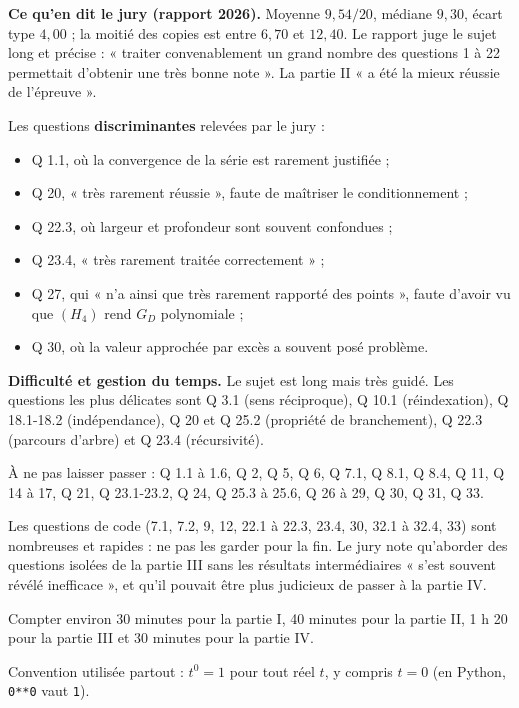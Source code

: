 \documentclass[11pt,a4paper]{article}
\providecommand{\tightlist}{\setlength{\itemsep}{0pt}\setlength{\parskip}{0pt}}
\begin{document}
\textbf{Ce qu'en dit le jury (rapport 2026).} Moyenne \(9{,}54/20\), médiane \(9{,}30\), écart type \(4{,}00\) ; la moitié des copies est entre \(6{,}70\) et \(12{,}40\). Le rapport juge le sujet long et précise : « traiter convenablement un grand nombre des questions 1 à 22 permettait d'obtenir une très bonne note ». La partie II « a été la mieux réussie de l'épreuve ».

Les questions \textbf{discriminantes} relevées par le jury :

\begin{itemize}
\tightlist
\item
  Q 1.1, où la convergence de la série est rarement justifiée ;
\item
  Q 20, « très rarement réussie », faute de maîtriser le conditionnement ;
\item
  Q 22.3, où largeur et profondeur sont souvent confondues ;
\item
  Q 23.4, « très rarement traitée correctement » ;
\item
  Q 27, qui « n'a ainsi que très rarement rapporté des points », faute d'avoir vu que \((H_4)\) rend \(G_D\) polynomiale ;
\item
  Q 30, où la valeur approchée par excès a souvent posé problème.
\end{itemize}

\textbf{Difficulté et gestion du temps.} Le sujet est long mais très guidé. Les questions les plus délicates sont Q 3.1 (sens réciproque), Q 10.1 (réindexation), Q 18.1-18.2 (indépendance), Q 20 et Q 25.2 (propriété de branchement), Q 22.3 (parcours d'arbre) et Q 23.4 (récursivité).

À ne pas laisser passer : Q 1.1 à 1.6, Q 2, Q 5, Q 6, Q 7.1, Q 8.1, Q 8.4, Q 11, Q 14 à 17, Q 21, Q 23.1-23.2, Q 24, Q 25.3 à 25.6, Q 26 à 29, Q 30, Q 31, Q 33.

Les questions de code (7.1, 7.2, 9, 12, 22.1 à 22.3, 23.4, 30, 32.1 à 32.4, 33) sont nombreuses et rapides : ne pas les garder pour la fin. Le jury note qu'aborder des questions isolées de la partie III sans les résultats intermédiaires « s'est souvent révélé inefficace », et qu'il pouvait être plus judicieux de passer à la partie IV.

Compter environ 30 minutes pour la partie I, 40 minutes pour la partie II, 1 h 20 pour la partie III et 30 minutes pour la partie IV.

Convention utilisée partout : \(t^0=1\) pour tout réel \(t\), y compris \(t=0\) (en Python, \texttt{0**0} vaut \texttt{1}).
\end{document}

